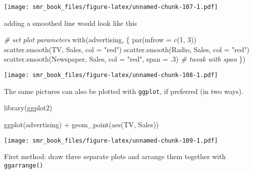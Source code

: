 \documentclass[
  oneside]{book}
\newenvironment{Shaded}{\begin{snugshade}}{\end{snugshade}}
\newcommand{\AttributeTok}[1]{\textcolor[rgb]{0.77,0.63,0.00}{#1}}
\newcommand{\CommentTok}[1]{\textcolor[rgb]{0.56,0.35,0.01}{\textit{#1}}}
\newcommand{\DecValTok}[1]{\textcolor[rgb]{0.00,0.00,0.81}{#1}}
\newcommand{\FunctionTok}[1]{\textcolor[rgb]{0.00,0.00,0.00}{#1}}
\newcommand{\NormalTok}[1]{#1}
\newcommand{\SpecialCharTok}[1]{\textcolor[rgb]{0.00,0.00,0.00}{#1}}
\newcommand{\StringTok}[1]{\textcolor[rgb]{0.31,0.60,0.02}{#1}}
\begin{document}
\texttt{[image: smr\_book\_files/figure-latex/unnamed-chunk-107-1.pdf]}

adding a smoothed line would look like this

\begin{Shaded}
\begin{Highlighting}[]
\CommentTok{\# set plot parameters}
\FunctionTok{with}\NormalTok{(advertising, \{}
  \FunctionTok{par}\NormalTok{(}\AttributeTok{mfrow =} \FunctionTok{c}\NormalTok{(}\DecValTok{1}\NormalTok{, }\DecValTok{3}\NormalTok{))}
  \FunctionTok{scatter.smooth}\NormalTok{(TV, Sales, }\AttributeTok{col =} \StringTok{"red"}\NormalTok{)}
  \FunctionTok{scatter.smooth}\NormalTok{(Radio, Sales, }\AttributeTok{col =} \StringTok{"red"}\NormalTok{)}
  \FunctionTok{scatter.smooth}\NormalTok{(Newspaper, Sales, }\AttributeTok{col =} \StringTok{"red"}\NormalTok{, }\AttributeTok{span =}\NormalTok{ .}\DecValTok{3}\NormalTok{) }\CommentTok{\# tweak with span}
\NormalTok{\})}
\end{Highlighting}
\end{Shaded}

\texttt{[image: smr\_book\_files/figure-latex/unnamed-chunk-108-1.pdf]}

The same pictures can also be plotted with \texttt{ggplot},
if preferred (in two ways).

\begin{Shaded}
\begin{Highlighting}[]
\FunctionTok{library}\NormalTok{(ggplot2)}

\FunctionTok{ggplot}\NormalTok{(advertising) }\SpecialCharTok{+}
  \FunctionTok{geom\_point}\NormalTok{(}\FunctionTok{aes}\NormalTok{(TV, Sales))}
\end{Highlighting}
\end{Shaded}

\texttt{[image: smr\_book\_files/figure-latex/unnamed-chunk-109-1.pdf]}

First method: draw three separate plots and arrange
them together with \texttt{ggarrange()}
\end{document}
